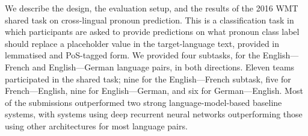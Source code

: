 We describe the design, the evaluation setup, and the results of the 2016 WMT shared task on cross-lingual pronoun prediction. This is a classification task in which participants are asked to provide predictions on what pronoun class label should replace a placeholder value in the target-language text, provided in lemmatised and PoS-tagged form. We provided four subtasks, for the English---French and English---German language pairs, in both directions. Eleven teams participated in the shared task; nine for the English---French subtask, five for French---English, nine for English---German, and six for German---English. Most of the submissions outperformed two strong language-model-based baseline systems, with systems using deep recurrent neural networks outperforming those using other architectures for most language pairs.
